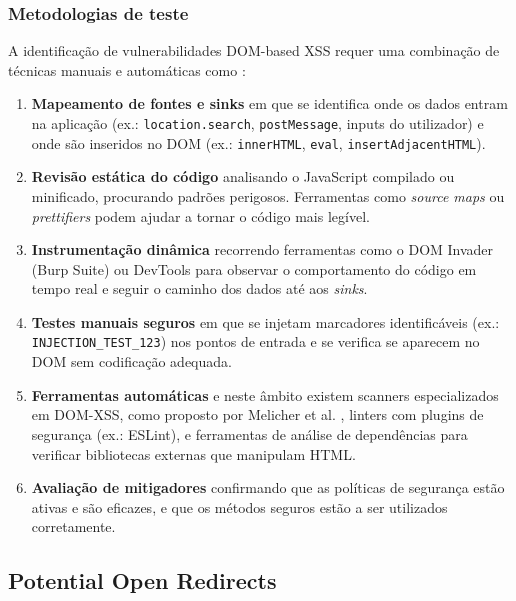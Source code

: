 \subsubsection{Metodologias de teste}
\label{subsubsec:metodologias-teste-dom-xss}

A identificação de vulnerabilidades DOM-based XSS requer uma combinação de técnicas manuais e automáticas como \cite{ref29, ref33}:

\begin{enumerate}
    \item \textbf{Mapeamento de fontes e sinks} em que se identifica onde os dados entram na aplicação (ex.: \texttt{location.search}, \texttt{postMessage}, inputs do utilizador) e onde são inseridos no DOM (ex.: \texttt{innerHTML}, \texttt{eval}, \texttt{insertAdjacentHTML}).
    
    \item \textbf{Revisão estática do código} analisando o JavaScript compilado ou minificado, procurando padrões perigosos. Ferramentas como \textit{source maps} ou \textit{prettifiers} podem ajudar a tornar o código mais legível.
    
    \item \textbf{Instrumentação dinâmica} recorrendo ferramentas como o DOM Invader (Burp Suite) ou DevTools para observar o comportamento do código em tempo real e seguir o caminho dos dados até aos \textit{sinks}.
    
    \item \textbf{Testes manuais seguros} em que se injetam marcadores identificáveis (ex.: \texttt{INJECTION\_TEST\_123}) nos pontos de entrada e se verifica se aparecem no DOM sem codificação adequada.
    
    \item \textbf{Ferramentas automáticas} e neste âmbito existem scanners especializados em DOM-XSS, como proposto por Melicher et al. \cite{ref33}, linters com plugins de segurança (ex.: ESLint), e ferramentas de análise de dependências para verificar bibliotecas externas que manipulam HTML.
    
    \item \textbf{Avaliação de mitigadores} confirmando que as políticas de segurança estão ativas e são eficazes, e que os métodos seguros estão a ser utilizados corretamente.
\end{enumerate}

\subsection{Potential Open Redirects}
\label{subsec:potential-open-redirects}

